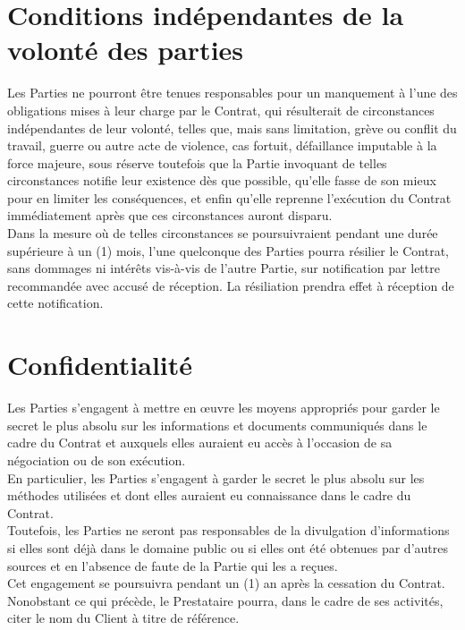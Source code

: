 \documentclass[9pt,french]{base}
\begin{document}
\begin{multicols*}{3}
\section{Conditions indépendantes de la volonté des parties}

Les Parties ne pourront être tenues responsables pour un manquement à l’une des obligations mises à leur charge par le Contrat, qui résulterait de circonstances indépendantes de leur volonté, telles que, mais sans limitation, grève ou conflit du travail, guerre ou autre acte de violence, cas fortuit, défaillance imputable à la force majeure, sous réserve toutefois que la Partie invoquant de telles circonstances notifie leur existence dès que possible, qu’elle fasse de son mieux pour en limiter les conséquences, et enfin qu’elle reprenne l’exécution du Contrat immédiatement après que ces circonstances auront disparu. \\
Dans la mesure où de telles circonstances se poursuivraient pendant une durée supérieure à un (1) mois, l’une quelconque des Parties pourra résilier le Contrat, sans dommages ni intérêts vis-à-vis de l’autre Partie, sur notification par lettre recommandée avec accusé de réception. La résiliation prendra effet à réception de cette notification.

\section{Confidentialité}

Les Parties s’engagent à mettre en œuvre les moyens appropriés pour garder le secret le plus absolu sur les informations et documents communiqués dans le cadre du Contrat et auxquels elles auraient eu accès à l’occasion de sa négociation ou de son exécution. \\
En particulier, les Parties s’engagent à garder le secret le plus absolu sur les méthodes utilisées et dont elles auraient eu connaissance dans le cadre du Contrat. \\
Toutefois, les Parties ne seront pas responsables de la divulgation d’informations si elles sont déjà dans le domaine public ou si elles ont été obtenues par d’autres sources et en l’absence de faute de la Partie qui les a reçues. \\
Cet engagement se poursuivra pendant un (1) an après la cessation du Contrat. \\
Nonobstant ce qui précède, le Prestataire pourra, dans le cadre de ses activités, citer le nom du Client à titre de référence.


\end{multicols*}
\end{document}

